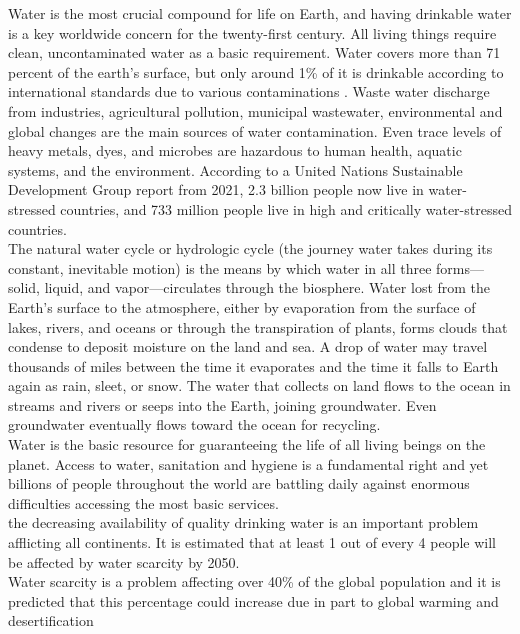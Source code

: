 \documentclass{article}
\begin{document}
Water is the most crucial compound for life on Earth, and having drinkable water is a key worldwide concern for the twenty-first century. All living things require clean, uncontaminated water as a basic requirement. Water covers more than 71 percent of the earth’s surface, but only around 1\% of it is drinkable according to international standards due to various contaminations . Waste water discharge from industries, agricultural pollution, municipal wastewater, environmental and global changes are the main sources of water contamination. Even trace levels of heavy metals, dyes, and microbes are hazardous to human health, aquatic systems, and the environment. According to a United Nations Sustainable Development Group report from 2021, 2.3 billion people now live in water-stressed countries, and 733 million people live in high and critically water-stressed countries.\\

The natural water cycle or hydrologic cycle (the journey water takes during its constant,
inevitable motion) is the means by which water in all three forms—solid,
liquid, and vapor—circulates through the biosphere. Water lost from the Earth’s surface
to the atmosphere, either by evaporation from the surface of lakes, rivers, and
oceans or through the transpiration of plants, forms clouds that condense to deposit
moisture on the land and sea. A drop of water may travel thousands of miles between
the time it evaporates and the time it falls to Earth again as rain, sleet, or snow. The
water that collects on land flows to the ocean in streams and rivers or seeps into the
Earth, joining groundwater. Even groundwater eventually flows toward the ocean for
recycling.\\

Water is the basic resource for guaranteeing the life of all living beings on the planet. Access to water, sanitation and hygiene is a fundamental right and yet billions of people throughout the world are battling daily against enormous difficulties accessing the most basic services.\\

the decreasing availability of quality drinking water is an important problem afflicting all continents. It is estimated that at least 1 out of every 4 people will be affected by  water scarcity by 2050.\\

Water scarcity is a problem affecting over 40\% of the global population and it is predicted that this percentage could increase due in part to global warming and desertification\\
\end{document}
